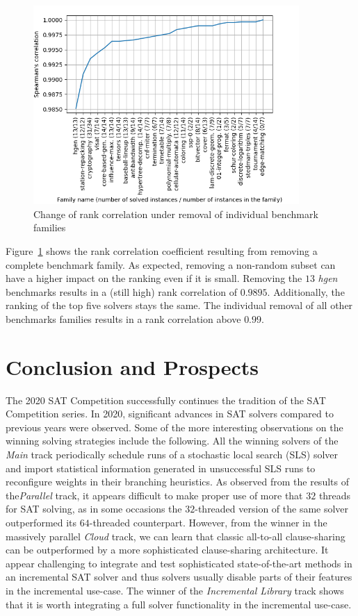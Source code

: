 \documentclass{elsarticle}
\begin{document}
\begin{figure}[t]
  \centering
  \includegraphics[width=0.9\textwidth]{stability/fam_leave_one_out_corr.png}
  \caption{Change of rank correlation under removal of individual benchmark families}
  \label{fig:sampleFamily}
\end{figure}

Figure~\ref{fig:sampleFamily} shows the rank
correlation coefficient resulting from removing a complete benchmark family. As expected, removing a non-random subset can have a
higher impact on the ranking even if it is small. Removing the $13$ \emph{hgen} benchmarks
results in a (still high) rank correlation of
$0.9895$. Additionally, the ranking of the top five solvers stays the same.
The individual removal of all other benchmarks families results in a rank correlation above $0.99$.

\section{Conclusion and Prospects}
\label{sec:conclusion}

The 2020 SAT Competition successfully continues the tradition of the SAT Competition series. In 2020, significant advances
in SAT solvers compared to previous years were observed. Some of the more interesting observations on the winning solving 
strategies include the following.
All the winning solvers of the \emph{Main} track periodically schedule runs of a stochastic local search (SLS)
solver and import statistical information generated in unsuccessful SLS runs to reconfigure weights in their branching heuristics. As observed
from the results of the\emph{Parallel} track, it appears difficult to make proper use of more that $32$ threads for SAT solving, as in some occasions the $32$-threaded version of the same solver outperformed its $64$-threaded counterpart. 
However, from the winner in the massively parallel \emph{Cloud} track, we can learn that classic all-to-all clause-sharing can be outperformed by a more sophisticated clause-sharing architecture. 
It appear challenging to integrate and test sophisticated state-of-the-art methods in an incremental SAT solver and thus solvers usually disable parts of their features in the incremental use-case. 
The winner of the \emph{Incremental Library} track shows that it is worth integrating a full solver functionality in the incremental use-case. 
\end{document}
